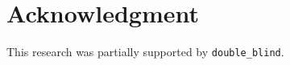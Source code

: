 \documentclass[sigconf]{acmart}
\begin{document}


% 

%

% 

% 



\section*{Acknowledgment}
This research was partially supported by \texttt{double\_blind}.




\end{document}

